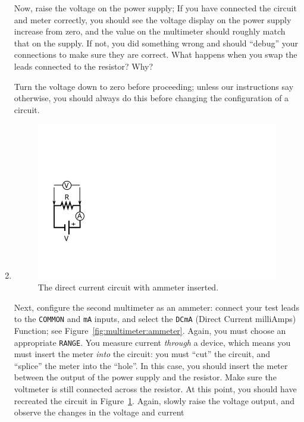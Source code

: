 \documentclass[12pt]{article}
\begin{document}
\begin{enumerate}
  Now, raise the voltage on the power supply; If you have connected
  the circuit and meter correctly, you should see the voltage display
  on the power supply increase from zero, and the value on the
  multimeter should roughly match that on the supply.  If not, you did
  something wrong and should ``debug'' your connections to make sure
  they are correct.  What happens when you swap the leads connected to
  the resistor?  Why?

  Turn the voltage down to zero before proceeding; unless our
  instructions say otherwise, you should always do this before
  changing the configuration of a circuit.
\item 
  \begin{figure}
    \centering
    \includegraphics[width=\textwidth/5]{figures/simplest_with_ammeter}
    \caption{The direct current circuit with ammeter inserted.}
    \label{fig:simplest_with_ammeter}
  \end{figure}
  Next, configure the second multimeter as an ammeter: connect your
  test leads to the \texttt{COMMON} and \texttt{mA} inputs, and select
  the \texttt{DCmA} (Direct Current milliAmps) Function; see
  Figure~\ref{fig:multimeter:ammeter}.  Again, you must choose an
  appropriate \texttt{RANGE}.  You measure current \textit{through} a
  device, which means you must insert the meter \textit{into} the
  circuit: you must ``cut'' the circuit, and ``splice'' the meter into
  the ``hole''.  In this case, you should insert the meter between the
  output of the power supply and the resistor.  Make sure the
  voltmeter is still connected across the resistor.  At this point,
  you should have recreated the circuit in
  Figure~\ref{fig:simplest_with_ammeter}.  Again, slowly raise the
  voltage output, and observe the changes in the voltage and current

\end{enumerate}
\end{document}
